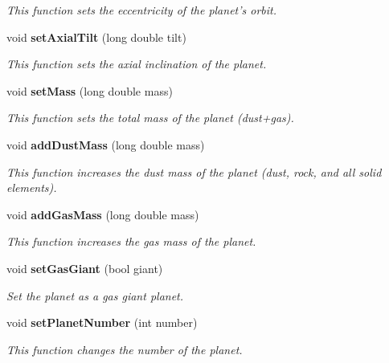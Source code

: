 \begin{CompactItemize}
\begin{CompactList}\small\item\em This function sets the eccentricity of the planet's orbit. \item\end{CompactList}\item 
void {\bf set\-Axial\-Tilt} (long double tilt)
\begin{CompactList}\small\item\em This function sets the axial inclination of the planet. \item\end{CompactList}\item 
void {\bf set\-Mass} (long double mass)
\begin{CompactList}\small\item\em This function sets the total mass of the planet (dust+gas). \item\end{CompactList}\item 
void {\bf add\-Dust\-Mass} (long double mass)
\begin{CompactList}\small\item\em This function increases the dust mass of the planet (dust, rock, and all solid elements). \item\end{CompactList}\item 
void {\bf add\-Gas\-Mass} (long double mass)
\begin{CompactList}\small\item\em This function increases the gas mass of the planet. \item\end{CompactList}\item 
void {\bf set\-Gas\-Giant} (bool giant)
\begin{CompactList}\small\item\em Set the planet as a gas giant planet. \item\end{CompactList}\item 
void {\bf set\-Planet\-Number} (int number)
\begin{CompactList}\small\item\em This function changes the number of the planet. \item\end{CompactList}\end{CompactItemize}
